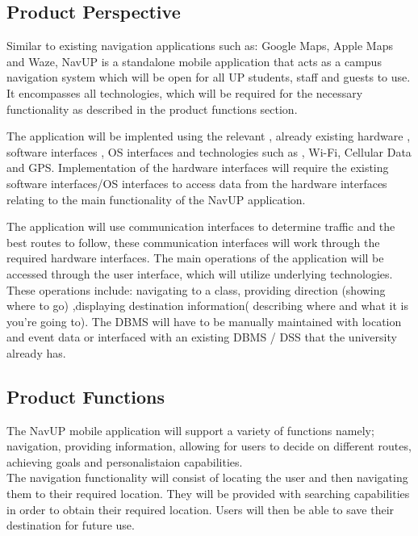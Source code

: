 \documentclass[11pt,a4paper]{article}
\begin{document}
	\subsection{Product Perspective}
	Similar to existing navigation applications such as: Google Maps, Apple Maps and Waze, NavUP is a standalone mobile application that acts as a campus navigation system which will be open for all UP students, staff and guests to use. It encompasses all technologies, which will be required for the necessary functionality as described in the product functions section. 
	\\
	\par
The application will be implented using the relevant ,  already existing hardware ,  software interfaces , OS interfaces and technologies such as , Wi-Fi, Cellular Data and GPS. Implementation of the hardware interfaces will require the  existing software interfaces/OS interfaces to access data from the hardware interfaces relating to the main functionality of the NavUP application. 
	\\
	\par
The application will use communication interfaces to determine traffic and the best routes to follow, these communication interfaces will work through the required hardware interfaces. The main operations of the application will be accessed through the user interface, which will utilize underlying  technologies. These operations include: navigating to a class,  providing direction (showing where to go) ,displaying destination information( describing where and what it is you're going to). The DBMS will have to be manually maintained with location and event data or interfaced with an existing DBMS / DSS that the university already has. 

	\subsection{Product Functions}
	The NavUP mobile application will support a variety of functions namely; navigation, providing information, allowing for users to decide on different routes, achieving goals and personalistaion capabilities.
	\\

	The navigation functionality will consist of locating the user and then navigating them to their required location. They will be provided with searching capabilities in order to obtain their required location. Users will then be able to save their destination for future use.
	\\
\end{document}
